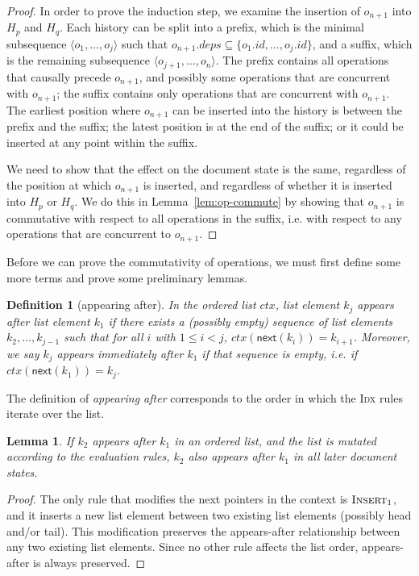 \documentclass[10pt,journal,compsoc]{IEEEtran}
\newtheorem{definition}{Definition}
\newtheorem{lemma}[theorem]{Lemma}
\begin{document}
\begin{proof}
In order to prove the induction step, we examine the insertion of $o_{n+1}$ into $H_p$ and $H_q$. Each history can be split into a prefix, which is the minimal subsequence $\langle o_1, \dots, o_j \rangle$ such that $o_{n+1}.\mathit{deps} \subseteq \{o_1.\mathit{id}, \dots, o_j.\mathit{id}\}$, and a suffix, which is the remaining subsequence $\langle o_{j+1}, \dots, o_n \rangle$. The prefix contains all operations that causally precede $o_{n+1}$, and possibly some operations that are concurrent with $o_{n+1}$; the suffix contains only operations that are concurrent with $o_{n+1}$. The earliest position where $o_{n+1}$ can be inserted into the history is between the prefix and the suffix; the latest position is at the end of the suffix; or it could be inserted at any point within the suffix.

We need to show that the effect on the document state is the same, regardless of the position at which $o_{n+1}$ is inserted, and regardless of whether it is inserted into $H_p$ or $H_q$. We do this in Lemma~\ref{lem:op-commute} by showing that $o_{n+1}$ is commutative with respect to all operations in the suffix, i.e. with respect to any operations that are concurrent to $o_{n+1}$.
\end{proof}

Before we can prove the commutativity of operations, we must first define some more terms and prove some preliminary lemmas.

\begin{definition}[appearing after]
In the ordered list $\mathit{ctx}$, list element $k_j$ \emph{appears after} list element $k_1$ if there exists a (possibly empty) sequence of list elements $k_2, \dots, k_{j-1}$ such that for all $i$ with $1 \le i < j$, $\mathit{ctx}(\mathsf{next}(k_i)) = k_{i+1}$. Moreover, we say $k_j$ appears \emph{immediately after} $k_1$ if that sequence is empty, i.e. if $\mathit{ctx}(\mathsf{next}(k_1)) = k_j$.
\end{definition}

The definition of \emph{appearing after} corresponds to the order in which the \textsc{Idx} rules iterate over the list.

\begin{lemma}\label{lem:list-after}
If $k_2$ appears after $k_1$ in an ordered list, and the list is mutated according to the evaluation rules, $k_2$ also appears after $k_1$ in all later document states.
\end{lemma}

\begin{proof}
The only rule that modifies the \textsf{next} pointers in the context is $\textsc{Insert}_1$, and it inserts a new list element between two existing list elements (possibly \textsf{head} and/or \textsf{tail}). This modification preserves the appears-after relationship between any two existing list elements. Since no other rule affects the list order, appears-after is always preserved.
\end{proof}
\end{document}
